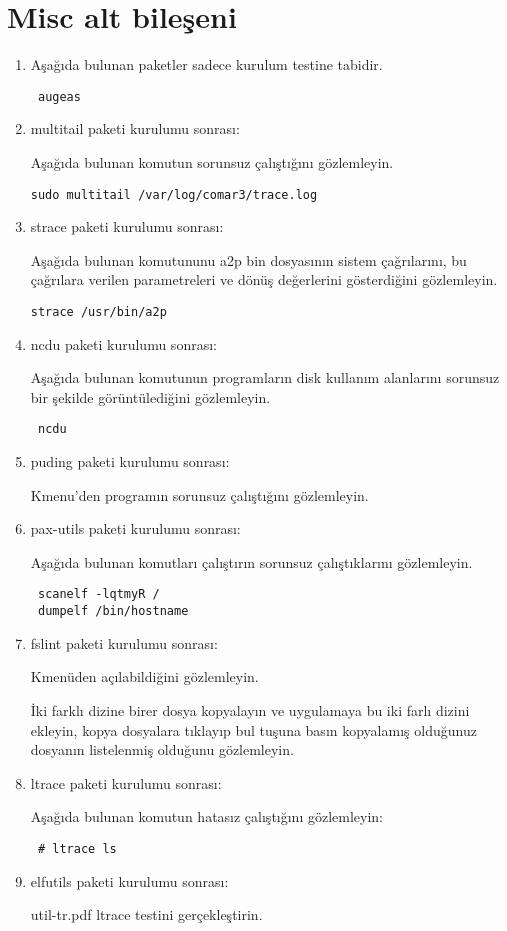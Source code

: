\documentclass[a4paper,10pt]{article}
\begin{document}
\section{Misc alt bileşeni}
\begin{enumerate}

\item Aşağıda bulunan paketler sadece kurulum testine tabidir.
\begin{verbatim}
 augeas
\end{verbatim}

\item multitail paketi kurulumu sonrası:

Aşağıda bulunan komutun sorunsuz çalıştığını gözlemleyin.
\begin{verbatim}
sudo multitail /var/log/comar3/trace.log 
\end{verbatim}


\item strace paketi kurulumu sonrası: 

Aşağıda bulunan komutununu a2p bin dosyasının sistem çağrılarını, bu çağrılara verilen parametreleri ve dönüş değerlerini gösterdiğini gözlemleyin.
\begin{verbatim}
strace /usr/bin/a2p 
\end{verbatim}



\item ncdu paketi kurulumu sonrası: 

Aşağıda bulunan komutunun programların disk kullanım alanlarını sorunsuz bir şekilde görüntülediğini gözlemleyin.
\begin{verbatim}
 ncdu 
\end{verbatim}


\item puding paketi kurulumu sonrası:

Kmenu'den programın sorunsuz çalıştığını gözlemleyin.

\item pax-utils paketi kurulumu sonrası:

Aşağıda bulunan komutları çalıştırın sorunsuz çalıştıklarını gözlemleyin.
\begin{verbatim}
 scanelf -lqtmyR /
 dumpelf /bin/hostname
\end{verbatim}

 \item fslint paketi kurulumu sonrası:

Kmenüden açılabildiğini gözlemleyin.

İki farklı dizine birer dosya kopyalayın ve uygulamaya bu iki farlı dizini ekleyin, kopya dosyalara tıklayıp bul tuşuna basın kopyalamış olduğunuz dosyanın listelenmiş olduğunu gözlemleyin.
 \item ltrace paketi kurulumu sonrası:

Aşağıda bulunan komutun hatasız çalıştığını gözlemleyin:
\begin{verbatim}
 # ltrace ls
\end{verbatim}
\item elfutils paketi kurulumu sonrası:

util-tr.pdf ltrace testini gerçekleştirin.
\end{enumerate}
\end{document}
